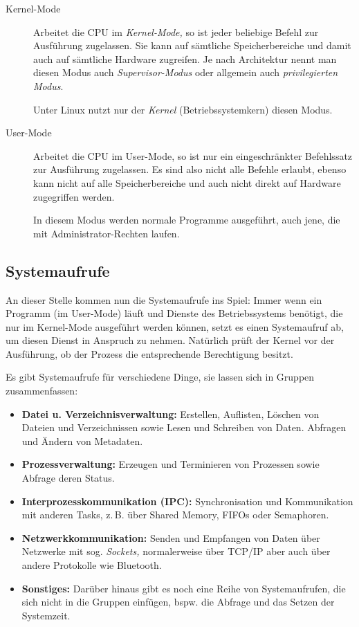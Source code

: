 \documentclass[10pt,DIV=15,twocolumn,ngerman,parskip=half]{scrartcl}
\begin{document}
\begin{description}
  \item[Kernel-Mode]
    Arbeitet die CPU im \emph{Kernel-Mode,} so ist jeder beliebige Befehl zur Ausführung 
    zugelassen. Sie kann auf sämtliche Speicherbereiche und damit auch auf sämtliche Hardware 
    zugreifen. Je nach Architektur nennt man diesen Modus auch \emph{Supervisor-Modus} oder
    allgemein auch \emph{privilegierten Modus}.

    Unter Linux nutzt nur der \emph{Kernel} (Betriebssystemkern) diesen Modus.

  \item[User-Mode] Arbeitet die CPU im User-Mode, so ist nur ein eingeschränkter Befehlssatz zur
     Ausführung zugelassen. Es sind also nicht alle Befehle erlaubt, ebenso kann nicht auf alle Speicherbereiche und auch nicht direkt auf Hardware zugegriffen werden. 

     In diesem Modus werden normale Programme ausgeführt, auch jene, die mit Administrator-Rechten 
     laufen.
\end{description}

\subsection{Systemaufrufe}

An dieser Stelle kommen nun die Systemaufrufe ins Spiel: Immer wenn ein Programm (im User-Mode)
läuft und Dienste des Betriebssystems benötigt, die nur im Kernel-Mode ausgeführt werden können,
setzt es einen Systemaufruf ab, um diesen Dienst in Anspruch zu nehmen. Natürlich prüft der Kernel
vor der Ausführung, ob der Prozess die entsprechende Berechtigung besitzt.

Es gibt Systemaufrufe für verschiedene Dinge, sie lassen sich in Gruppen
zusammenfassen:

\begin{itemize}
  \item \textbf{Datei u. Verzeichnisverwaltung:} Erstellen, Auflisten, Löschen von Dateien und 
    Verzeichnissen sowie Lesen und Schreiben von Daten. Abfragen und Ändern von Metadaten.
  \item \textbf{Prozessverwaltung:} Erzeugen und Terminieren von Prozessen sowie Abfrage deren 
   Status.
  \item \textbf{Interprozesskommunikation (IPC):} Synchronisation und Kommunikation mit anderen Tasks, z.\,B. über Shared Memory, FIFOs oder Semaphoren.
  \item \textbf{Netzwerkkommunikation:} Senden und Empfangen von Daten über Netzwerke mit sog.
   \emph{Sockets,} normalerweise über TCP/IP aber auch über andere Protokolle wie Bluetooth.
  \item \textbf{Sonstiges:} Darüber hinaus gibt es noch eine Reihe von Systemaufrufen, die sich
    nicht in die Gruppen einfügen, bspw. die Abfrage und das Setzen der Systemzeit.
\end{itemize}
\end{document}
